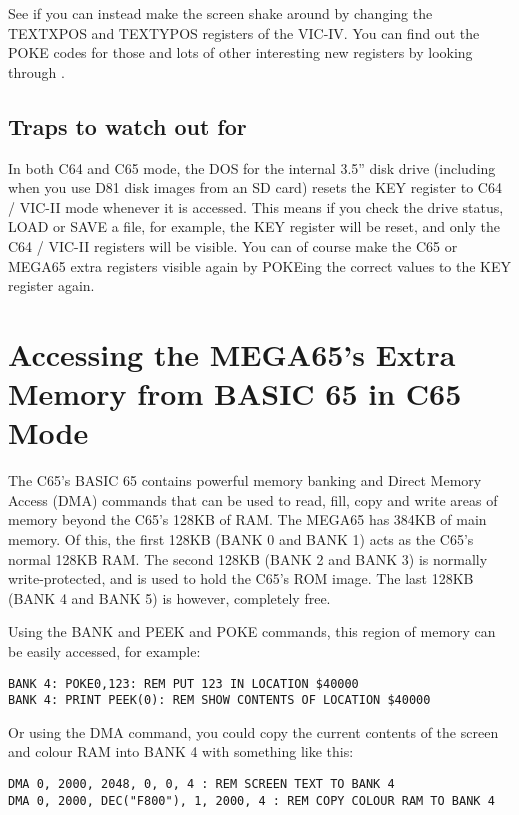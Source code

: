 See if you can instead make the screen shake around by changing the TEXTXPOS and TEXTYPOS registers of
the VIC-IV.  You can find out the POKE codes for those and lots of other interesting new registers
by looking through .

\subsection{Traps to watch out for}

In both C64 and C65 mode, the DOS for the internal 3.5'' disk drive (including when you use D81 disk images from
an SD card) resets the KEY register to C64 / VIC-II mode whenever it is accessed. This means if you check the drive
status, LOAD or SAVE a file, for example, the KEY register will be reset, and only the C64 / VIC-II registers
will be visible. You can of course make the C65 or MEGA65 extra registers visible again by POKEing the correct values
to the KEY register again.

\section{Accessing the MEGA65's Extra Memory from BASIC 65 in C65 Mode}

The C65's BASIC 65 contains powerful memory banking and Direct Memory Access (DMA) commands that can be used to read,
fill, copy and write areas of memory beyond the C65's 128KB of RAM.  The MEGA65 has 384KB of main memory. Of this,
the first 128KB (BANK 0 and BANK 1) acts as the C65's normal 128KB RAM. The second 128KB (BANK 2 and BANK 3) is normally
write-protected, and is used to hold the C65's ROM image.  The last 128KB (BANK 4 and BANK 5) is however, completely free.

Using the BANK and PEEK and POKE commands, this region of memory can be easily accessed, for example:

\begin{tcolorbox}[colback=black,coltext=white]
\verbatimfont{\codefont}
\begin{verbatim}
BANK 4: POKE0,123: REM PUT 123 IN LOCATION $40000
BANK 4: PRINT PEEK(0): REM SHOW CONTENTS OF LOCATION $40000
\end{verbatim}
\end{tcolorbox}

Or using the DMA command, you could copy the current contents of the screen and colour RAM into BANK 4 with something like this:

\begin{tcolorbox}[colback=black,coltext=white]
\verbatimfont{\codefont}
\begin{verbatim}
DMA 0, 2000, 2048, 0, 0, 4 : REM SCREEN TEXT TO BANK 4
DMA 0, 2000, DEC("F800"), 1, 2000, 4 : REM COPY COLOUR RAM TO BANK 4
\end{verbatim}
\end{tcolorbox}

